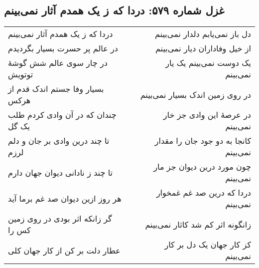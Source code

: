 \begin{center}
\section*{غزل شماره ۵۷۹: دردا که ز یک همدم آثار نمی‌بینم}
\label{sec:579}
\begin{longtable}{l p{0.5cm} r}
دردا که ز یک همدم آثار نمی‌بینم
&&
دل باز نمی‌یابم دلدار نمی‌بینم
\\
در عالم پر حسرت بسیار بگردیدم
&&
از خیل وفاداران دیار نمی‌بینم
\\
در چار سوی عالم شش گوشهٔ توتویش
&&
یک دوست نمی‌بینم یک یار نمی‌بینم
\\
بسیار وفا جستم اندک قدم از هرکس
&&
در روی زمین اندک بسیار نمی‌بینم
\\
چندان که در آن وادی کردم طلب یک گل
&&
در عرصهٔ این وادی جز خار نمی‌بینم
\\
تا چند درین وادی بر جان و دلم لرزم
&&
کانجا به دو جود جان را مقدار نمی‌بینم
\\
تا چند ز نادانی دیوان جهان دارم
&&
چون مورد درین دیوان جز مار نمی‌بینم
\\
هر روز ازین دیوان صد غم برما آید
&&
دردا که درین صد غم غمخوار نمی‌بینم
\\
گر زانکه اثر بودی در روی زمین کس را
&&
زانگونه اثر کم شد کاثار نمی‌بینم
\\
عطار دلت بر کن از کار جهان کلی
&&
کز کار جهان یک دل بر کار نمی‌بینم
\\
\end{longtable}
\end{center}
